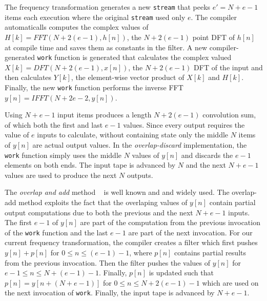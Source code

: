 The frequency transformation generates a new {\tt stream} that
peeks $e'=N+e-1$ items each execution where the original {\tt stream} used only $e$.
The compiler automaticalls computes the complex values of
$H[k]=FFT(N+2(e-1),h[n])$, the $N+2(e-1)$ point DFT of $h[n]$ at compile
time and saves them as constants in the filter.
A new compiler-generated {\tt work} function is generated that calculates the complex 
valued $X[k]=DFT(N+2(e-1),x[n])$, the $N+2(e-1)$ DFT of the input and 
then calculates $Y[k]$, the element-wise vector product 
of $X[k]$ and $H[k]$. Finally, the new {\tt work} function performs
the inverse FFT $y[n]=IFFT(N+2e-2,y[n])$.

Using $N+e-1$ input items produces a length $N+2(e-1)$ convolution sum, 
of which both the first and last $e-1$ values. Since every output requires 
the value of $e$ inputs to calculate, without containing state 
only the middle $N$ items of $y[n]$ are actual output values. 
In the {\it overlap-discard} implementation, the {\tt work} function simply
uses the middle $N$ values of $y[n]$ and discards the 
$e-1$ elements on both ends. The input tape is advanced by $N$ and the next 
$N+e-1$ values are used to produce the next $N$ outputs.

The {\it overlap and add} method ~\cite{oppenheim-discrete} is well known and and widely used.
The overlap-add method exploits the fact that the overlaping values of $y[n]$ contain partial
output computations due to both the previous and the next $N+e-1$ inputs.
The first $e-1$ of $y[n]$ are part of the computation from the previous invocation of the 
{\tt work} function and the last $e-1$ are part of the next invocation. 
For our current frequency transformation, the compiler creates a filter which first pushes 
$y[n]+p[n]$ for $0 \le n \le (e-1)-1$, where $p[n]$ contains partial results from the 
previous invocation. Then the filter pushes the values of $y[n]$ for $e-1 \le n \le N+(e-1)-1$.
Finally, $p[n]$ is updated such that $p[n]=y[n+(N+e-1)]$ for 
$0 \le n \le N+2(e-1)-1$ which are used on the next invocation of {\tt work}.
Finally, the input tape is advanced by $N+e-1$.


